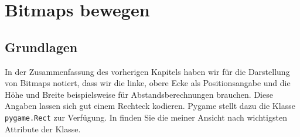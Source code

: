 \newpage
\section{Bitmaps bewegen}
\subsection{Grundlagen}
In der Zusammenfassung des vorherigen Kapitels haben wir für die Darstellung von Bitmaps notiert, dass wir die linke, obere Ecke als Positionsangabe und die Höhe und Breite beispielsweise für Abstandsberechnungen brauchen. Diese Angaben lassen sich gut einem Rechteck kodieren. Pygame stellt dazu die Klasse \texttt{pygame.Rect} zur Verfügung. In  finden Sie die meiner Ansicht nach wichtigsten Attribute der Klasse.

